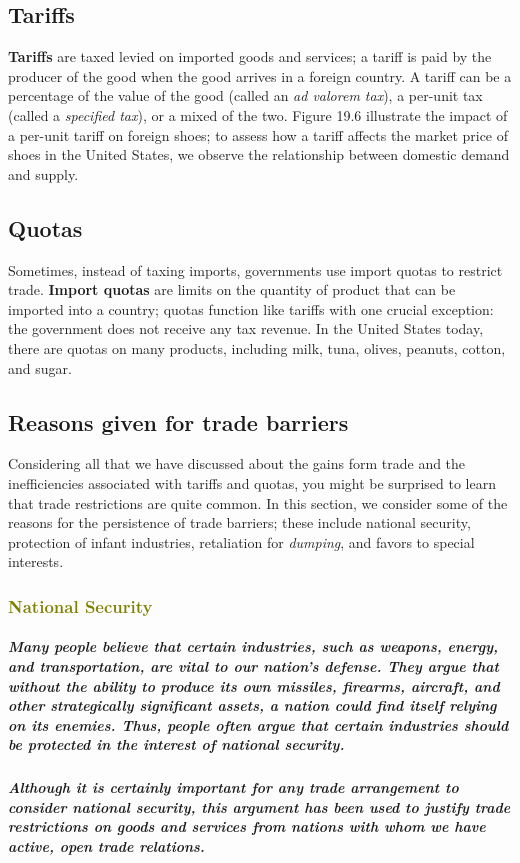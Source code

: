 \documentclass[11pt]{article} %
\begin{document}
\subsection*{Tariffs}
\textbf{Tariffs} are taxed levied on imported goods and services; a tariff is paid by the producer of the good when the good arrives in a foreign country. A tariff can be a percentage of the value of the good (called an \textit{ad valorem tax}), a per-unit tax (called a \textit{specified tax}), or a mixed of the two. Figure 19.6 illustrate the impact of a per-unit tariff on foreign shoes; to assess how a tariff affects the market price of shoes in the United States, we observe the relationship between domestic demand and supply.


\subsection*{Quotas}
Sometimes, instead of taxing imports, governments use import quotas to restrict trade. \textbf{Import quotas} are limits on the quantity of product that can be imported into a country; quotas function like tariffs with one crucial exception: the government does not receive any tax revenue. In the United States today, there are quotas on many products, including milk, tuna, olives, peanuts, cotton, and sugar.


\subsection*{Reasons given for trade barriers}
Considering all that we have discussed about the gains form trade and the inefficiencies associated with tariffs and quotas, you might be surprised to learn that trade restrictions are quite common. In this section, we consider some of the reasons for the persistence of trade barriers; these include national security, protection of infant industries, retaliation for \textit{dumping}, and favors to special interests.
\subsubsection*{\textcolor{olive}{National Security}}
\subparagraph*{Many people believe that certain industries, such as weapons, energy, and transportation, are vital to our nation's defense. They argue that without the ability to produce its own missiles, firearms, aircraft, and other strategically significant assets, a nation could find itself relying on its enemies. Thus, people often argue that certain industries should be protected in the interest of national security.}
\subparagraph*{Although it is certainly important for any trade arrangement to consider national security, this argument has been used to justify trade restrictions on goods and services from nations with whom we have active, open trade relations.}
\end{document}
